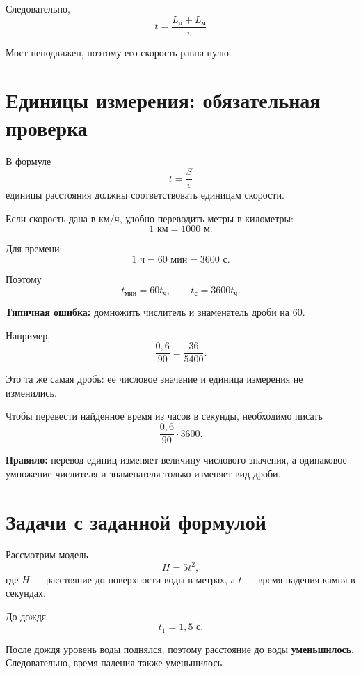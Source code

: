 \documentclass[a4paper,12pt]{article}
\newcommand{\key}[1]{\textcolor{darkaccent}{\textbf{#1}}}
\newcommand{\warningtext}[1]{\textcolor{warning}{\textbf{#1}}}
\begin{document}
Следовательно,
\[
\boxed{
t=
\frac{L_{\text{п}}+L_{\text{м}}}{v}
}
\]

Мост неподвижен, поэтому его скорость равна нулю.


\section{Единицы измерения: обязательная проверка}

В формуле
\[
t=\frac{S}{v}
\]
единицы расстояния должны соответствовать единицам скорости.

Если скорость дана в \(\text{км/ч}\), удобно переводить метры в километры:
\[
1\text{ км}=1000\text{ м}.
\]

Для времени:
\[
1\text{ ч}=60\text{ мин}=3600\text{ с}.
\]

Поэтому
\[
t_{\text{мин}}=60t_{\text{ч}},
\qquad
t_{\text{с}}=3600t_{\text{ч}}.
\]

\warningtext{Типичная ошибка:}
домножить числитель и знаменатель дроби на \(60\).

Например,
\[
\frac{0{,}6}{90}
=
\frac{36}{5400}.
\]

Это та же самая дробь:
её числовое значение и единица измерения не изменились.

Чтобы перевести найденное время из часов в секунды, необходимо писать
\[
\frac{0{,}6}{90}\cdot3600.
\]

\key{Правило:}
перевод единиц изменяет величину числового значения,
а одинаковое умножение числителя и знаменателя только изменяет вид дроби.


\section{Задачи с заданной формулой}

Рассмотрим модель
\[
H=5t^2,
\]
где \(H\) --- расстояние до поверхности воды в метрах,
а \(t\) --- время падения камня в секундах.

До дождя
\[
t_1=1{,}5\text{ с}.
\]

После дождя уровень воды поднялся, поэтому расстояние до воды
\key{уменьшилось}. Следовательно, время падения также уменьшилось.
\end{document}
